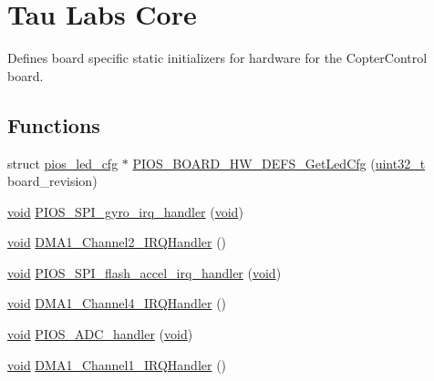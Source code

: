 \hypertarget{group___tau_labs_core}{\section{Tau Labs Core}
\label{group___tau_labs_core}
}


Defines board specific static initializers for hardware for the Copter\-Control board.  


\subsection*{Functions}
\begin{DoxyCompactItemize}
\item 
struct \hyperlink{structpios__led__cfg}{pios\-\_\-led\-\_\-cfg} $\ast$ \hyperlink{group___tau_labs_core_ga6fa5ac351dd7ee24342369a40c9f6055}{P\-I\-O\-S\-\_\-\-B\-O\-A\-R\-D\-\_\-\-H\-W\-\_\-\-D\-E\-F\-S\-\_\-\-Get\-Led\-Cfg} (\hyperlink{stdint_8h_a435d1572bf3f880d55459d9805097f62}{uint32\-\_\-t} board\-\_\-revision)
\item 
\hyperlink{group___n_a_m_e_ga18028b8badbf1ea7e704ccac3c488e82}{void} \hyperlink{group___tau_labs_core_ga6f05a1487b9b8de794d06f0e6241e983}{P\-I\-O\-S\-\_\-\-S\-P\-I\-\_\-gyro\-\_\-irq\-\_\-handler} (\hyperlink{group___n_a_m_e_ga18028b8badbf1ea7e704ccac3c488e82}{void})
\item 
\hyperlink{group___n_a_m_e_ga18028b8badbf1ea7e704ccac3c488e82}{void} \hyperlink{group___tau_labs_core_ga4055152a9bfe1072e00247cc351276ba}{D\-M\-A1\-\_\-\-Channel2\-\_\-\-I\-R\-Q\-Handler} ()
\item 
\hyperlink{group___n_a_m_e_ga18028b8badbf1ea7e704ccac3c488e82}{void} \hyperlink{group___tau_labs_core_ga6f6266c85c7c1d13a0945cde0127069e}{P\-I\-O\-S\-\_\-\-S\-P\-I\-\_\-flash\-\_\-accel\-\_\-irq\-\_\-handler} (\hyperlink{group___n_a_m_e_ga18028b8badbf1ea7e704ccac3c488e82}{void})
\item 
\hyperlink{group___n_a_m_e_ga18028b8badbf1ea7e704ccac3c488e82}{void} \hyperlink{group___tau_labs_core_ga9cdc63af1166aec768f87546a48bec8d}{D\-M\-A1\-\_\-\-Channel4\-\_\-\-I\-R\-Q\-Handler} ()
\item 
\hyperlink{group___n_a_m_e_ga18028b8badbf1ea7e704ccac3c488e82}{void} \hyperlink{group___tau_labs_core_gad6ef17a736d2c33cf82ce413c8a9b070}{P\-I\-O\-S\-\_\-\-A\-D\-C\-\_\-handler} (\hyperlink{group___n_a_m_e_ga18028b8badbf1ea7e704ccac3c488e82}{void})
\item 
\hyperlink{group___n_a_m_e_ga18028b8badbf1ea7e704ccac3c488e82}{void} \hyperlink{group___tau_labs_core_gabd49de55f82b1a0be3edaaf34dbe4b14}{D\-M\-A1\-\_\-\-Channel1\-\_\-\-I\-R\-Q\-Handler} ()

\end{DoxyCompactItemize}
